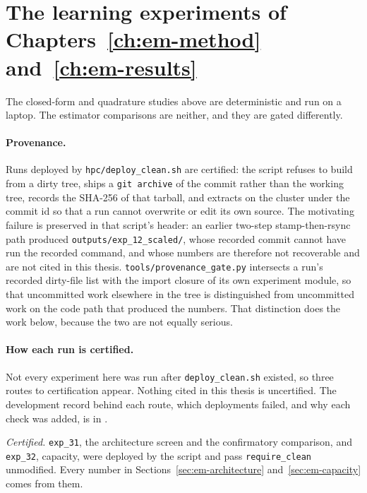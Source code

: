 \begin{center}
\begin{minipage}{\linewidth}
\end{minipage}
\end{center}

\section[The learning experiments]{The learning experiments of
Chapters~\ref{ch:em-method} and~\ref{ch:em-results}}\label{sec:repro-learning}

The closed-form and quadrature studies above are deterministic and run on a
laptop. The estimator comparisons are neither, and they are gated
differently.

\paragraph{Provenance.} Runs deployed by \texttt{hpc/deploy\_clean.sh} are
certified: the script refuses to build from a dirty tree, ships a
\texttt{git archive} of the commit rather than the working tree, records the
SHA-256 of that tarball, and extracts on the cluster under the commit id so that
a run cannot overwrite or edit its own source. The motivating failure is
preserved in that script's header: an earlier two-step stamp-then-rsync path
produced \texttt{outputs/exp\_12\_scaled/}, whose recorded commit cannot have
run the recorded command, and whose numbers are therefore not recoverable and
are not cited in this thesis. \texttt{tools/provenance\_gate.py} intersects a
run's recorded dirty-file list with the import closure of its own experiment
module, so that uncommitted work elsewhere in the tree is distinguished from
uncommitted work on the code path that produced the numbers. That distinction
does the work below, because the two are not equally serious.

\paragraph{How each run is certified.} Not every experiment here was run after
\texttt{deploy\_clean.sh} existed, so three routes to certification appear.
Nothing cited in this thesis is uncertified. The development record behind each
route, which deployments failed, and why each check was added, is in
\compendium{}.

\emph{Certified.} \texttt{exp\_31}, the architecture screen and the
confirmatory comparison, and \texttt{exp\_32}, capacity, were deployed by the
script and pass \texttt{require\_clean} unmodified. Every number in
Sections~\ref{sec:em-architecture} and~\ref{sec:em-capacity} comes from them.


